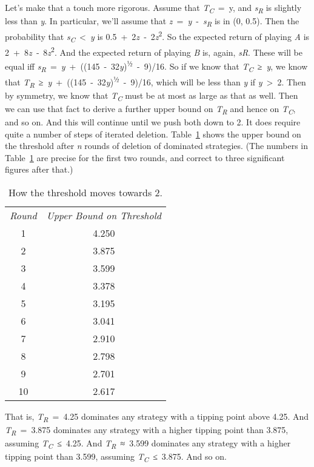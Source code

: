 \documentclass[
  10pt,
  letterpaper,
  twoside]{scrbook}
\begin{document}
Let's make that a touch more rigorous. Assume that
\emph{T\textsubscript{C}}~=~y, and \emph{s\textsubscript{R}} is slightly
less than \emph{y}. In particular, we'll assume that
\emph{z}~=~\emph{y}~-~\emph{s\textsubscript{R}} is in (0, 0.5). Then the
probability that \emph{s\textsubscript{C}}~\textless~\emph{y} is
0.5~+~2\emph{z}~‑~2\emph{z}\textsuperscript{2}. So the expected return
of playing \emph{A} is 2~+~8\emph{z}~‑~8\emph{z}\textsuperscript{2}. And
the expected return of playing \emph{B} is, again, \emph{sR}. These will
be equal iff
\emph{s\textsubscript{R}}~=~\emph{y}~+~((145~-~32\emph{y})\textsuperscript{½}~-~9)/16.
So if we know that \emph{T\textsubscript{C}}~≥~\emph{y}, we know that
\emph{T\textsubscript{R}}~≥~\emph{y}~+~((145~-~32\emph{y})\textsuperscript{½}~-~9)/16,
which will be less than \emph{y} if \emph{y}~\textgreater~2. Then by
symmetry, we know that \emph{T\textsubscript{C}} must be at most as
large as that as well. Then we can use that fact to derive a further
upper bound on \emph{T\textsubscript{R}} and hence on
\emph{T\textsubscript{C}}, and so on. And this will continue until we
push both down to 2. It does require quite a number of steps of iterated
deletion. Table~\ref{tbl-threshold} shows the upper bound on the
threshold after \emph{n} rounds of deletion of dominated strategies.
(The numbers in Table~\ref{tbl-threshold} are precise for the first two
rounds, and correct to three significant figures after that.)

\begin{longtable}[]{@{}cc@{}}
\caption{How the threshold moves towards
2.}\label{tbl-threshold}\tabularnewline
\toprule\noalign{}
\endfirsthead
\endhead
\bottomrule\noalign{}
\endlastfoot
\emph{Round} & \emph{Upper Bound on Threshold} \\
1 & 4.250 \\
2 & 3.875 \\
3 & 3.599 \\
4 & 3.378 \\
5 & 3.195 \\
6 & 3.041 \\
7 & 2.910 \\
8 & 2.798 \\
9 & 2.701 \\
10 & 2.617 \\
\end{longtable}

That is, \emph{T\textsubscript{R}}~=~4.25 dominates any strategy with a
tipping point above 4.25. And \emph{T\textsubscript{R}}~=~3.875
dominates any strategy with a higher tipping point than 3.875, assuming
\emph{T\textsubscript{C}}~≤~4.25. And \emph{T\textsubscript{R}}~≈~3.599
dominates any strategy with a higher tipping point than 3.599, assuming
\emph{T\textsubscript{C}}~≤~3.875. And so on.
\end{document}
